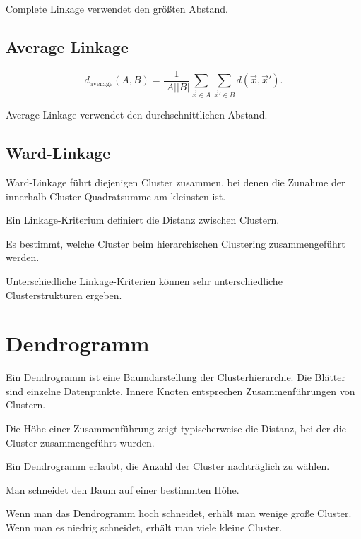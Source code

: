 Complete Linkage verwendet den größten Abstand.

\subsection{Average Linkage}

\[
    d_{\mathrm{average}}(A,B)
    =
    \frac{1}{|A||B|}
    \sum_{\vec{x}\in A}
    \sum_{\vec{x}'\in B}
    d(\vec{x},\vec{x}').
\]

Average Linkage verwendet den durchschnittlichen Abstand.

\subsection{Ward-Linkage}

Ward-Linkage führt diejenigen Cluster zusammen, bei denen die Zunahme der innerhalb-Cluster-Quadratsumme am kleinsten ist.

\begin{definitionbox}
Ein Linkage-Kriterium definiert die Distanz zwischen Clustern.

Es bestimmt, welche Cluster beim hierarchischen Clustering zusammengeführt werden.
\end{definitionbox}

\begin{notebox}
Unterschiedliche Linkage-Kriterien können sehr unterschiedliche Clusterstrukturen ergeben.
\end{notebox}

\section{Dendrogramm}

Ein Dendrogramm ist eine Baumdarstellung der Clusterhierarchie.
Die Blätter sind einzelne Datenpunkte.
Innere Knoten entsprechen Zusammenführungen von Clustern.

Die Höhe einer Zusammenführung zeigt typischerweise die Distanz, bei der die Cluster zusammengeführt wurden.

\begin{conceptbox}
Ein Dendrogramm erlaubt, die Anzahl der Cluster nachträglich zu wählen.

Man schneidet den Baum auf einer bestimmten Höhe.
\end{conceptbox}

Wenn man das Dendrogramm hoch schneidet, erhält man wenige große Cluster.
Wenn man es niedrig schneidet, erhält man viele kleine Cluster.

